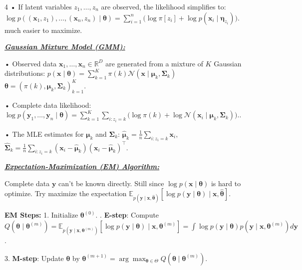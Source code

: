 \documentclass[10pt]{article}
\newcommand{\bulletPoint}[1]{\ul{\textit{\textbf{#1}}}}
\begin{document}
\begin{multicols*}{4}
• If latent variables $z_1, \dots, z_n$ are observed, the likelihood simplifies to:
$\log p((\mathbf{x}_1, z_1), \dots, (\mathbf{x}_n, z_n) \mid \boldsymbol{\theta}) = \sum_{i=1}^{n} \big( \log \pi[z_i] + \log p(\mathbf{x}_i \mid \boldsymbol{\eta}_{z_i}) \big)$.
much easier to maximize.


\bulletPoint{Gaussian Mixture Model (GMM):}\quad

• Observed data $\mathbf{x}_1, \dots, \mathbf{x}_n \in \mathbb{R}^{D}$ are generated from a mixture of $K$ Gaussian distributions:
$p(\mathbf{x} \mid \boldsymbol{\theta}) = \sum_{k=1}^{K} \pi(k) \mathcal{N} (\mathbf{x} \mid \boldsymbol{\mu}_k, \boldsymbol{\Sigma}_k)$
$\boldsymbol{\theta} = (\pi(k), \boldsymbol{\mu}_k, \boldsymbol{\Sigma}_k)_{k=1}^{K}$. 

• Complete data likelihood:
$\log p(\mathbf{y}_1, \dots, \mathbf{y}_n \mid \boldsymbol{\theta}) = \sum_{k=1}^{K} \sum_{i: z_i = k} \big( \log \pi(k) + \log \mathcal{N} (\mathbf{x}_i \mid \boldsymbol{\mu}_k, \boldsymbol{\Sigma}_k) \big).$. 

• The MLE estimates for $\boldsymbol{\mu}_k$ and $\boldsymbol{\Sigma}_k$:
$ \hat{\boldsymbol{\mu}}_k = \frac{1}{n} \sum_{i: z_i = k} \mathbf{x}_i, $ 
$ \hat{\boldsymbol{\Sigma}}_k = \frac{1}{n} \sum_{i: z_i = k} (\mathbf{x}_i - \hat{\boldsymbol{\mu}}_k)(\mathbf{x}_i - \hat{\boldsymbol{\mu}}_k)^{\top} $.

\bulletPoint{Expectation-Maximization (EM) Algorithm:}\quad

Complete data $\mathbf{y}$ can't be known directly. Still since $\log p(\mathbf{x} \mid \boldsymbol{\theta})$ is hard to optimize. Try maximize the expectation $\mathbb{E}_{p(\mathbf{y} \mid \mathbf{x}, \hat{\boldsymbol{\theta}})} \left[ \log p(\mathbf{y} \mid \boldsymbol{\theta}) \mid \mathbf{x}, \hat{\boldsymbol{\theta}} \right]$. 

\textbf{EM Steps:} 1. Initialize $\boldsymbol{\theta}^{(0)}$. . \textbf{E-step}: Compute $Q(\boldsymbol{\theta} \mid \boldsymbol{\theta}^{(m)}) = \mathbb{E}_{p(\mathbf{y} \mid \mathbf{x}, \boldsymbol{\theta}^{(m)})} \left[ \log p(\mathbf{y} \mid \boldsymbol{\theta}) \mid \mathbf{x}, \boldsymbol{\theta}^{(m)} \right] = \int \log p(\mathbf{y} \mid \boldsymbol{\theta}) p(\mathbf{y} \mid \mathbf{x}, \boldsymbol{\theta}^{(m)}) d\mathbf{y}$. \quad

3. \textbf{M-step}: Update $\boldsymbol{\theta}$ by $\boldsymbol{\theta}^{(m+1)} = \arg\max_{\boldsymbol{\theta} \in \Theta} Q(\boldsymbol{\theta} \mid \boldsymbol{\theta}^{(m)})$. 


\end{multicols*}
\end{document}
